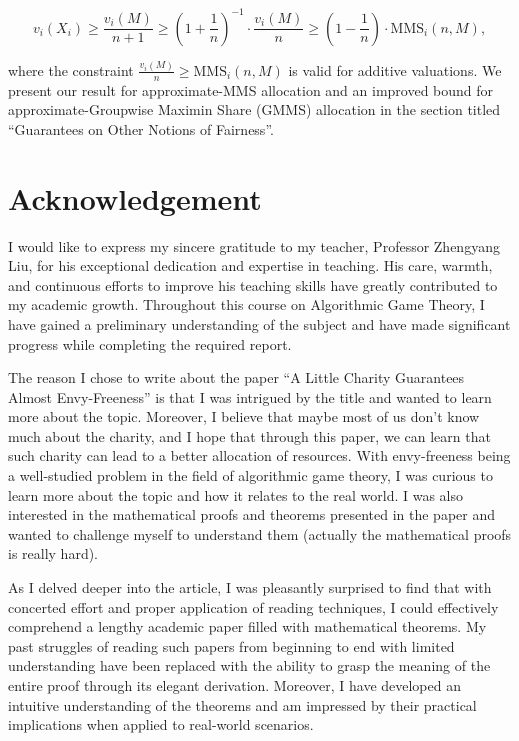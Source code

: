 \documentclass{article}
\begin{document}
\[
v_i(X_i) \geq \frac{v_i(M)}{n + 1} \geq \left(1 + \frac{1}{n}\right)^{-1} \cdot \frac{v_i(M)}{n} \geq \left(1 - \frac{1}{n}\right) \cdot \text{MMS}_i(n, M),
\]

where the constraint $\frac{v_i(M)}{n} \geq \text{MMS}_i(n, M)$ is valid for additive valuations. We present our result for approximate-MMS allocation and an improved bound for approximate-Groupwise Maximin Share (GMMS) allocation in the section titled “Guarantees on Other Notions of Fairness”.


\section{Acknowledgement} \label{sec:ack}

I would like to express my sincere gratitude to my teacher, Professor Zhengyang Liu, for his exceptional dedication and expertise in teaching. His care, warmth, and continuous efforts to improve his teaching skills have greatly contributed to my academic growth. Throughout this course on Algorithmic Game Theory, I have gained a preliminary understanding of the subject and have made significant progress while completing the required report.

The reason I chose to write about the paper “A Little Charity Guarantees Almost Envy-Freeness” is that I was intrigued by the title and wanted to learn more about the topic. Moreover, I believe that maybe most of us don't know much about the charity, and I hope that through this paper, we can learn that such charity can lead to a better allocation of resources. With envy-freeness being a well-studied problem in the field of algorithmic game theory, I was curious to learn more about the topic and how it relates to the real world. I was also interested in the mathematical proofs and theorems presented in the paper and wanted to challenge myself to understand them (actually the mathematical proofs is really hard).

As I delved deeper into the article, I was pleasantly surprised to find that with concerted effort and proper application of reading techniques, I could effectively comprehend a lengthy academic paper filled with mathematical theorems. My past struggles of reading such papers from beginning to end with limited understanding have been replaced with the ability to grasp the meaning of the entire proof through its elegant derivation. Moreover, I have developed an intuitive understanding of the theorems and am impressed by their practical implications when applied to real-world scenarios.
\end{document}
